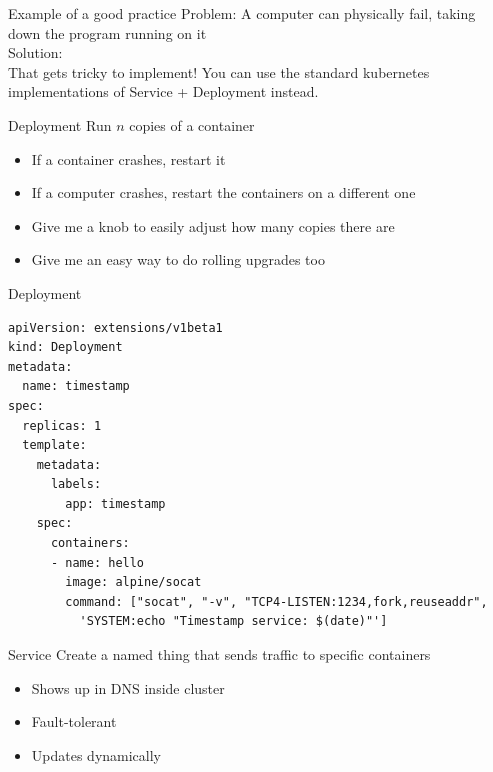 \documentclass[xcolor=svgnames,17pt]{beamer}
\newcommand*{\sizefont}[1]{%
    \ifcase#1\relax
    \or \tiny
    \or \scriptsize
    \or \footnotesize
    \or \small
    \or \normalsize
    \or \large
    \or \Large
    \or \LARGE
    \or \huge
    \or \Huge
    \fi}
\begin{document}
\begin{frame}{Example of a good practice}
Problem: A computer can physically fail, taking down the program running
on it
\\[\baselineskip]
Solution: \\
\pause
That gets tricky to implement! You can use the standard kubernetes
implementations of Service + Deployment instead.
\end{frame}

\begin{frame}{Deployment}
Run $n$ copies of a container
\pause
\begin{itemize}
\item If a container crashes, restart it
\item If a computer crashes, restart the containers on a different one
\item Give me a knob to easily adjust how many copies there are
\item Give me an easy way to do rolling upgrades too
\end{itemize}
\end{frame}

\begin{frame}[fragile]{Deployment}
\sizefont{2}
\begin{verbatim}
apiVersion: extensions/v1beta1
kind: Deployment
metadata:
  name: timestamp
spec:
  replicas: 1
  template:
    metadata:
      labels:
        app: timestamp
    spec:
      containers:
      - name: hello
        image: alpine/socat
        command: ["socat", "-v", "TCP4-LISTEN:1234,fork,reuseaddr",
          'SYSTEM:echo "Timestamp service: $(date)"']
\end{verbatim}
\end{frame}

\begin{frame}{Service}
Create a named thing that sends traffic to specific containers
\pause
\begin{itemize}
\item Shows up in DNS inside cluster
\item Fault-tolerant
\item Updates dynamically
\end{itemize}
\end{frame}
\end{document}
